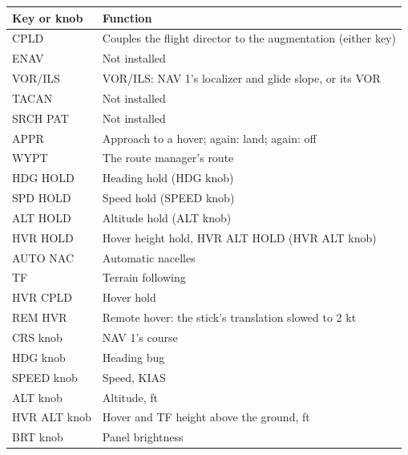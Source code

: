 \begin{tabular}{@{}lp{}@{}}
\toprule
Key or knob & Function \\
\midrule
CPLD & Couples the flight director to the augmentation (either key) \\
ENAV & Not installed \\
VOR/ILS & VOR/ILS: NAV 1's localizer and glide slope, or its VOR \\
TACAN & Not installed \\
SRCH PAT & Not installed \\
APPR & Approach to a hover; again: land; again: off \\
WYPT & The route manager's route \\
HDG HOLD & Heading hold (HDG knob) \\
SPD HOLD & Speed hold (SPEED knob) \\
ALT HOLD & Altitude hold (ALT knob) \\
HVR HOLD & Hover height hold, HVR ALT HOLD (HVR ALT knob) \\
AUTO NAC & Automatic nacelles \\
TF & Terrain following \\
HVR CPLD & Hover hold \\
REM HVR & Remote hover: the stick's translation slowed to 2 kt \\
CRS knob & NAV 1's course \\
HDG knob & Heading bug \\
SPEED knob & Speed, KIAS \\
ALT knob & Altitude, ft \\
HVR ALT knob & Hover and TF height above the ground, ft \\
BRT knob & Panel brightness \\
\bottomrule
\end{tabular}

